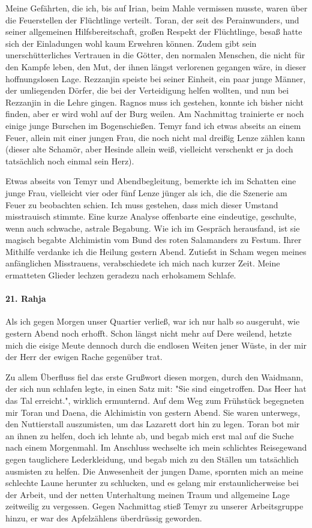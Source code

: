 Meine Gefährten, die ich, bis auf Irian, beim Mahle vermissen musste, waren über die Feuerstellen der Flüchtlinge verteilt. Toran, der seit des Perainwunders, und seiner allgemeinen Hilfsbereitschaft, großen Respekt der Flüchtlinge, besaß hatte sich der Einladungen wohl kaum Erwehren können. Zudem gibt sein unerschütterliches Vertrauen in die Götter, den normalen Menschen, die nicht für den Kampfe leben, den Mut, der ihnen längst verlorenen gegangen wäre, in dieser hoffnungslosen Lage. Rezzanjin speiste bei seiner Einheit, ein paar junge Männer, der umliegenden Dörfer, die bei der Verteidigung helfen wollten, und nun bei Rezzanjin in die Lehre gingen. Ragnos muss ich gestehen, konnte ich bisher nicht finden, aber er wird wohl auf der Burg weilen. Am Nachmittag trainierte er noch einige junge Burschen im Bogenschießen. Temyr fand ich etwas abseits an einem Feuer, allein mit einer jungen Frau, die noch nicht mal dreißig Lenze zählen kann (dieser alte Schamör, aber Hesinde allein weiß, vielleicht verschenkt er ja doch tatsächlich noch einmal sein Herz). 

Etwas abseits von Temyr und Abendbegleitung, bemerkte ich im Schatten eine junge Frau, vielleicht vier oder fünf Lenze jünger als ich, die die Szenerie am Feuer zu beobachten schien. Ich muss gestehen, dass mich dieser Umstand misstrauisch stimmte. Eine kurze Analyse offenbarte eine eindeutige, geschulte, wenn auch schwache, astrale Begabung. Wie ich im Gespräch herausfand, ist sie magisch begabte Alchimistin vom Bund des roten Salamanders zu Festum. Ihrer Mithilfe verdanke ich die Heilung gestern Abend. Zutiefst in Scham wegen meines anfänglichen Misstrauens, verabschiedete ich mich nach kurzer Zeit. Meine ermatteten Glieder lechzen geradezu nach erholsamem Schlafe.

\paragraph{21. Rahja}
Als ich gegen Morgen unser Quartier verließ, war ich nur halb so ausgeruht, wie gestern Abend noch erhofft. Schon längst nicht mehr auf Dere weilend, hetzte mich die eisige Meute dennoch durch die endlosen Weiten jener Wüste, in der mir der Herr der ewigen Rache gegenüber trat.

Zu allem Überfluss fiel das erste Grußwort diesen morgen, durch den Waidmann, der sich nun schlafen legte, in einen Satz mit: "Sie sind eingetroffen. Das Heer hat das Tal erreicht.", wirklich ermunternd. Auf dem Weg zum Frühstück begegneten mir Toran und Daena, die Alchimistin von gestern Abend. Sie waren unterwegs, den Nuttierstall auszumisten, um das Lazarett dort hin zu legen. Toran bot mir an ihnen zu helfen, doch ich lehnte ab, und begab mich erst mal auf die Suche nach einem Morgenmahl. Im Anschluss wechselte ich mein schlichtes Reisegewand gegen tauglichere Lederkleidung, und begab mich zu den Ställen um tatsächlich ausmisten zu helfen. Die Anwesenheit der jungen Dame, spornten mich an meine schlechte Laune herunter zu schlucken, und es gelang mir erstaunlicherweise bei der Arbeit, und der netten Unterhaltung meinen Traum und allgemeine Lage zeitweilig zu vergessen. Gegen Nachmittag stieß Temyr zu unserer Arbeitsgruppe hinzu, er war des Apfelzählens überdrüssig geworden.


